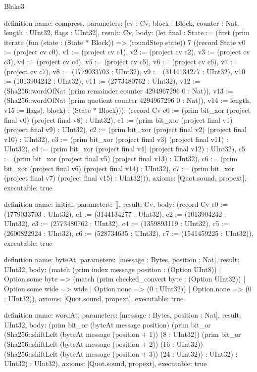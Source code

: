 \begin{lexlean}{Blake3}
\begin{semanticmodule}
definition{
  name: compress,
  parameters: [cv : Cv, block : Block, counter : Nat, length : UInt32, flags : UInt32],
  result: Cv,
  body: (let final : State := (first (prim iterate (fun (state : (State * Block)) => (roundStep state)) 7 ((record State {v0 := (project cv c0), v1 := (project cv c1), v2 := (project cv c2), v3 := (project cv c3), v4 := (project cv c4), v5 := (project cv c5), v6 := (project cv c6), v7 := (project cv c7), v8 := (1779033703 : UInt32), v9 := (3144134277 : UInt32), v10 := (1013904242 : UInt32), v11 := (2773480762 : UInt32), v12 := (Sha256::wordOfNat (prim remainder counter 4294967296 0 : Nat)), v13 := (Sha256::wordOfNat (prim quotient counter 4294967296 0 : Nat)), v14 := length, v15 := flags}), block) : (State * Block))); (record Cv {c0 := (prim bit_xor (project final v0) (project final v8) : UInt32), c1 := (prim bit_xor (project final v1) (project final v9) : UInt32), c2 := (prim bit_xor (project final v2) (project final v10) : UInt32), c3 := (prim bit_xor (project final v3) (project final v11) : UInt32), c4 := (prim bit_xor (project final v4) (project final v12) : UInt32), c5 := (prim bit_xor (project final v5) (project final v13) : UInt32), c6 := (prim bit_xor (project final v6) (project final v14) : UInt32), c7 := (prim bit_xor (project final v7) (project final v15) : UInt32)})),
  axioms: [Quot.sound, propext],
  executable: true
}

definition{
  name: initial,
  parameters: [],
  result: Cv,
  body: (record Cv {c0 := (1779033703 : UInt32), c1 := (3144134277 : UInt32), c2 := (1013904242 : UInt32), c3 := (2773480762 : UInt32), c4 := (1359893119 : UInt32), c5 := (2600822924 : UInt32), c6 := (528734635 : UInt32), c7 := (1541459225 : UInt32)}),
  executable: true
}

definition{
  name: byteAt,
  parameters: [message : Bytes, position : Nat],
  result: UInt32,
  body: (match (prim index message position : (Option UInt8))
    | Option.some byte => (match (prim checked_convert byte : (Option UInt32))
      | Option.some wide => wide
      | Option.none => (0 : UInt32))
    | Option.none => (0 : UInt32)),
  axioms: [Quot.sound, propext],
  executable: true
}

definition{
  name: wordAt,
  parameters: [message : Bytes, position : Nat],
  result: UInt32,
  body: (prim bit_or (byteAt message position) (prim bit_or (Sha256::shiftLeft (byteAt message (position + 1)) (8 : UInt32)) (prim bit_or (Sha256::shiftLeft (byteAt message (position + 2)) (16 : UInt32)) (Sha256::shiftLeft (byteAt message (position + 3)) (24 : UInt32)) : UInt32) : UInt32) : UInt32),
  axioms: [Quot.sound, propext],
  executable: true
}


\end{semanticmodule}
\end{lexlean}
